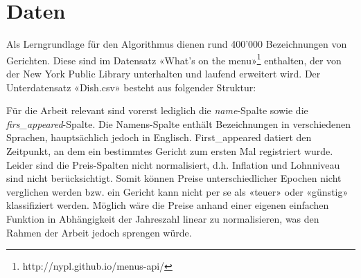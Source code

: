 \section{Daten}
\label{sec:model-data-training}

Als Lerngrundlage für den Algorithmus dienen rund 400'000 Bezeichnungen von Gerichten.
Diese sind im Datensatz «What's on the menu»\footnote{http://nypl.github.io/menus-api/} enthalten, der von
der New York Public Library unterhalten und laufend erweitert wird.
Der Unterdatensatz «Dish.csv» besteht aus folgender Struktur:

\begin{center}
\end{center}

Für die Arbeit relevant sind vorerst lediglich die \textit{name}-Spalte sowie die \textit*{firs\_appeared}-Spalte.
Die Namens-Spalte enthält Bezeichnungen in verschiedenen Sprachen, hauptsächlich jedoch in Englisch.
First\_appeared datiert den Zeitpunkt, an dem ein bestimmtes Gericht zum ersten Mal registriert wurde.
Leider sind die Preis-Spalten nicht normalisiert, d.h. Inflation und Lohnniveau sind nicht berücksichtigt.
Somit können Preise unterschiedlicher Epochen nicht verglichen werden bzw. ein Gericht kann nicht per se als «teuer» oder
«günstig» klassifiziert werden.
Möglich wäre die Preise anhand einer eigenen einfachen Funktion in Abhängigkeit der Jahreszahl linear zu normalisieren, was
den Rahmen der Arbeit jedoch sprengen würde.
